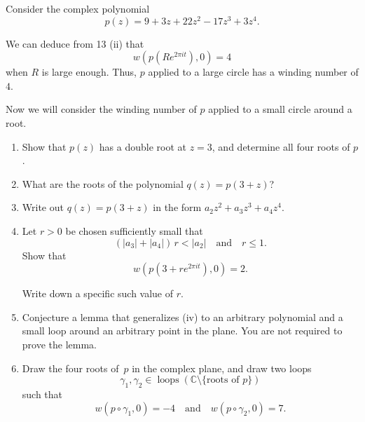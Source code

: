 \documentclass[12 pt, letterpaper]{hmcpset}
\begin{document}
\begin{problem}[14.]
	Consider the complex polynomial
	\[
		p(z) = 9 + 3z + 22z^2 - 17z^3 + 3z^4.
	\]

	We can deduce from 13 (ii) that
	\[
		w(p(Re^{2\pi i t}), 0) = 4
	\]
	when $R$ is large enough. Thus, $p$ applied to a large circle has a winding number of $4$.

	Now we will consider the winding number of $p$ applied to a small circle around a root.

	\begin{enumerate}
		\item Show that $p(z)$ has a double root at $z = 3$, and determine all four roots of $p$.
		\item What are the roots of the polynomial $q(z) = p(3 + z)$?
		\item Write out $q(z) = p(3+z)$ in the form $a_2 z^2 + a_3 z^3 + a_4 z^4$.
		\item Let $r > 0$ be chosen sufficiently small that
			\[
				(\lvert a_{3} \rvert + \lvert a_{4} \rvert) \, r < |a_2| \quad \text{and} \quad r \leq 1.
			\]
			Show that
			\[
				w(p(3 + re^{2\pi i t}), 0) = 2.
			\]

			Write down a specific such value of $r$.
		\item Conjecture a lemma that generalizes (iv) to an arbitrary polynomial and a small loop around an arbitrary point in the plane. You are not required to prove the lemma.
		\item Draw the four roots of~$p$ in the complex plane, and draw two loops
			\[
				\gamma_{1}, \gamma_{2} \in \operatorname{loops}(\mathbb{C} \setminus \{ \text{roots of } p \})
			\]
			such that
			\[
				w(p \circ \gamma_{1}, 0) = -4 \quad \text{and} \quad w(p \circ \gamma_{2}, 0) = 7.
			\]

	\end{enumerate}
\end{problem}
\end{document}
